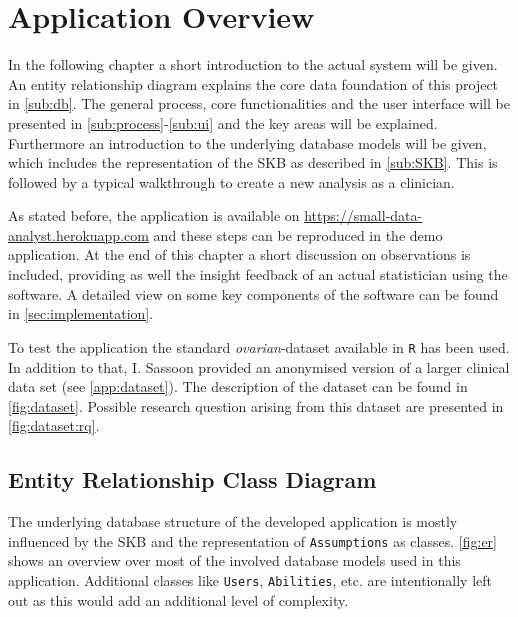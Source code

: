 \section{Application Overview}
In the following chapter a short introduction to the actual system will be given. An entity relationship diagram explains the core data foundation of this project in \autoref{sub:db}. The general process, core functionalities and the user interface will be presented in \autoref{sub:process}-\ref{sub:ui} and the key areas will be explained. Furthermore an introduction to the underlying database models will be given, which includes the representation of the \gls{SKB} as described in \autoref{sub:SKB}. This is followed by a typical walkthrough to create a new analysis as a clinician. 

As stated before, the application is available on \href{https://small-data-analyst.herokuapp.com}{https://small-data-analyst.herokuapp.com} and these steps can be reproduced in the demo application. At the end of this chapter a short discussion on observations is included, providing as well the insight feedback of an actual statistician using the software. A detailed view on some key components of the software can be found in \autoref{sec:implementation}.

To test the application the standard \textit{ovarian}-dataset available in \texttt{R} has been used. In addition to that, I. Sassoon provided an anonymised version of a larger clinical data set (see \autoref{app:dataset}). The description of the dataset can be found in \autoref{fig:dataset}. Possible research question arising from this dataset are presented in \autoref{fig:dataset:rq}.



\subsection{Entity Relationship Class Diagram }
\label{sub:db}

The underlying database structure of the developed application is mostly influenced by the \gls{SKB} and the representation of \texttt{Assumptions} as classes. \autoref{fig:er} shows an overview over most of the involved database models used in this application. Additional classes like \texttt{Users}, \texttt{Abilities}, etc. are intentionally left out as this would add an additional level of complexity. 

